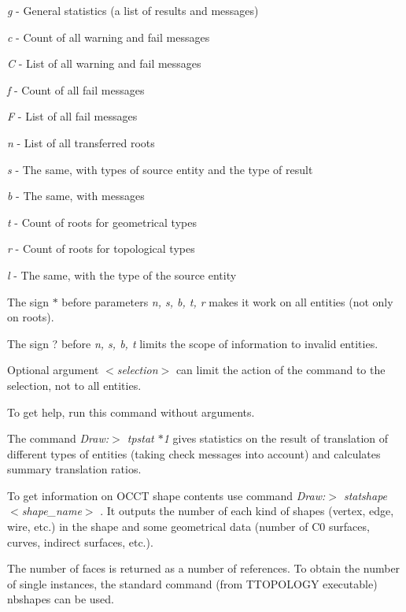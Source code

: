 \begin{DoxyItemize}
\item {\itshape g} -\/ General statistics (a list of results and messages)
\item {\itshape c} -\/ Count of all warning and fail messages
\item {\itshape C} -\/ List of all warning and fail messages
\item {\itshape f} -\/ Count of all fail messages
\item {\itshape F} -\/ List of all fail messages
\item {\itshape n} -\/ List of all transferred roots
\item {\itshape s} -\/ The same, with types of source entity and the type of result
\item {\itshape b} -\/ The same, with messages
\item {\itshape t} -\/ Count of roots for geometrical types
\item {\itshape r} -\/ Count of roots for topological types
\item {\itshape l} -\/ The same, with the type of the source entity
\end{DoxyItemize}

The sign $\ast$ before parameters {\itshape n, s, b, t, r} makes it work on all entities (not only on roots).

The sign ? before {\itshape n, s, b, t} limits the scope of information to invalid entities.

Optional argument {\itshape $<$selection$>$} can limit the action of the command to the selection, not to all entities.

To get help, run this command without arguments.

The command {\itshape Draw\+:$>$ tpstat $\ast$1} gives statistics on the result of translation of different types of entities (taking check messages into account) and calculates summary translation ratios.

To get information on O\+C\+CT shape contents use command {\itshape Draw\+:$>$ statshape $<$shape\+\_\+name$>$} . It outputs the number of each kind of shapes (vertex, edge, wire, etc.) in the shape and some geometrical data (number of C0 surfaces, curves, indirect surfaces, etc.).

The number of faces is returned as a number of references. To obtain the number of single instances, the standard command (from T\+T\+O\+P\+O\+L\+O\+GY executable) nbshapes can be used.

